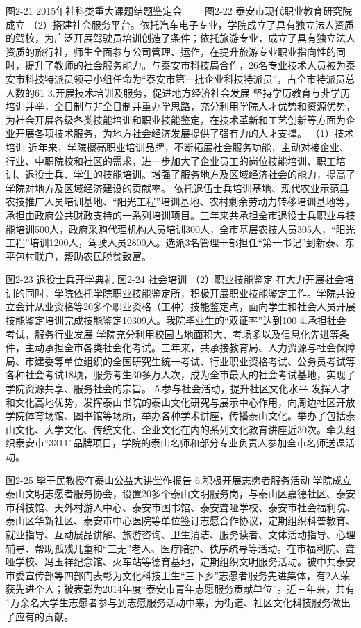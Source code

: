    
图2-21 2015年社科类重大课题结题鉴定会　　 图2-22 泰安市现代职业教育研究院成立
（2）搭建社会服务平台。依托汽车电子专业，学院成立了具有独立法人资质的驾校，为广泛开展驾驶员培训创造了条件；依托旅游专业，成立了具有独立法人资质的旅行社，师生全面参与公司管理、运作，在提升旅游专业职业指向性的同时，提升了教师的社会服务能力。与泰安市科技局合作，26名专业技术人员被为泰安市科技特派员领导小组任命为“泰安市第一批企业科技特派员”，占全市特派员总人数的61%
3.开展技术培训及服务，促进地方经济社会发展
坚持学历教育与非学历培训并举，全日制与非全日制并重办学思路，充分利用学院人才优势和资源优势，为社会开展各级各类技能培训和职业技能鉴定，在技术革新和工艺创新等方面为企业开展各项技术服务，为地方社会经济发展提供了强有力的人才支撑。
（1）技术培训
近年来，学院擦亮职业培训品牌，不断拓展社会服务功能，主动对接企业、行业、中职院校和社区的需求，进一步加大了企业员工的岗位技能培训、职工培训、退役士兵、学生的技能培训。增强了服务地方及区域经济社会的能力，提高了学院对地方及区域经济建设的贡献率。
依托退伍士兵培训基地、现代农业示范县农技推广人员培训基地、“阳光工程”培训基地、农村剩余劳动力转移培训基地等，承担由政府公共财政支持的一系列培训项目。三年来共承担全市退役士兵职业与技能培训500人，政府采购代理机构人员培训300人，全市基层农技人员305人，“阳光工程”培训1200人，驾驶人员2800人。选派3名管理干部担任“第一书记”到新泰、东平包村联户，帮助农民脱贫致富。
          
图2-23 退役士兵开学典礼                         图2-24 社会培训
（2）职业技能鉴定
在大力开展社会培训的同时，学院依托学院职业技能鉴定所，积极开展职业技能鉴定工作。学院共设立会计从业资格等20多个职业资格（工种）技能鉴定点，面向学生和社会人员开展技能鉴定培训完成技能鉴定10309人。我院毕业生的“双证率”达到100%
4.承担社会考试，服务行业发展
学院充分利用校园占地面积大、考场多以及信息化先进等条件，主动承担全市各类社会化考试。三年来，共承接教育局、人力资源与社会保障局、市建委等单位组织的全国研究生统一考试、行业职业资格考试、公务员考试等各种社会考试18项，服务考生30多万人次，成为全市最大的社会考试基地，实现了学院资源共享、服务社会的宗旨。
5.参与社会活动，提升社区文化水平
发挥人才和文化高地优势，发挥泰山书院的泰山文化研究与展示中心作用，向周边社区开放学院体育场馆、图书馆等场所，举办各种学术讲座，传播泰山文化。举办了包括泰山文化、大学文化、传统文化、企业文化在内的系列文化教育讲座近30次。牵头组织泰安市“3311”品牌项目，学院的泰山名师和部分专业负责人参加全市名师送课活动。

图2-25  毕于民教授在泰山公益大讲堂作报告
6.积极开展志愿者服务活动
学院成立泰山文明志愿者服务协会，设置20多个泰山文明服务岗，与泰山区嘉德社区、泰安市科技馆、天外村游人中心、泰安市图书馆、泰安聋哑学校、泰安市社会福利院、泰山区华新社区、泰安市中心医院等单位签订志愿合作协议，定期组织科普教育、就业指导、互动展品讲解、旅游咨询、卫生清洁、服务读者、文体活动指导、心理辅导、帮助孤残儿童和“三无”老人、医疗陪护、秩序疏导等活动。在市福利院、聋哑学校、冯玉祥纪念馆、火车站等德育基地，定期组织文明服务活动。被中共泰安市委宣传部等四部门表彰为文化科技卫生“三下乡”志愿者服务先进集体，有2人荣获先进个人；被表彰为2014年度“泰安市青年志愿服务贡献单位”。近三年来，共有1万余名大学生志愿者参与到志愿服务活动中来，为街道、社区文化科技服务做出了应有的贡献。
    
